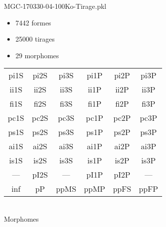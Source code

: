 MGC-170330-04-100Ko-Tirage.pkl
\begin{itemize}
\item 7442 formes
\item 25000 tirages
\item 29 morphomes
\end{itemize}
\begin{center}
\begin{tabular}{cccccc}
\hline
\cellcolor{white}pi1S & \cellcolor{orange}pi2S & \cellcolor{orange}pi3S & \cellcolor{white}pi1P & \cellcolor{white}pi2P & \cellcolor{white}pi3P\\
\cellcolor{brown}ii1S & \cellcolor{brown}ii2S & \cellcolor{brown}ii3S & \cellcolor{white}ii1P & \cellcolor{white}ii2P & \cellcolor{brown}ii3P\\
\cellcolor{yellow}fi1S & \cellcolor{lime}fi2S & \cellcolor{lime}fi3S & \cellcolor{green}fi1P & \cellcolor{white}fi2P & \cellcolor{green}fi3P\\
\cellcolor{yellow}pc1S & \cellcolor{yellow}pc2S & \cellcolor{yellow}pc3S & \cellcolor{white}pc1P & \cellcolor{white}pc2P & \cellcolor{yellow}pc3P\\
\cellcolor{teal}ps1S & \cellcolor{white}ps2S & \cellcolor{teal}ps3S & \cellcolor{white}ps1P & \cellcolor{blue}ps2P & \cellcolor{teal}ps3P\\
\cellcolor{white}ai1S & \cellcolor{lightgray}ai2S & \cellcolor{lightgray}ai3S & \cellcolor{blue}ai1P & \cellcolor{pink}ai2P & \cellcolor{white}ai3P\\
\cellcolor{black}is1S & \cellcolor{black}is2S & \cellcolor{lightgray}is3S & \cellcolor{black}is1P & \cellcolor{black}is2P & \cellcolor{pink}is3P\\
--- & \cellcolor{white}pI2S & --- & \cellcolor{white}pI1P & \cellcolor{white}pI2P & ---\\
\cellcolor{white}inf & \cellcolor{white}pP & \cellcolor{white}ppMS & \cellcolor{white}ppMP & \cellcolor{pink}ppFS & \cellcolor{pink}ppFP\\
\hline
\end{tabular}\\
Morphomes
\end{center}
\bigskip


